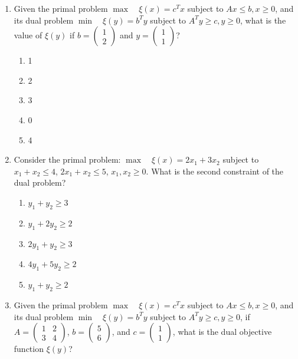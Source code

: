 \documentclass{article}%
\begin{document}
\begin{enumerate}
\begin{enumerate}
\item Weak duality implies that if the primal problem is unbounded, then the dual problem must be infeasible, and vice versa.%
\item Weak duality states that the optimal objective function value of the primal problem is always greater than or equal to the optimal objective function value of the dual problem, regardless of feasibility.%
\item Weak duality is only relevant for linear programs with equality constraints; it does not apply to linear programs with inequality constraints.%
\end{enumerate}%
\vspace{1em}%
\item Given the primal problem $\max \quad \xi(x) = c^T x$ subject to $Ax \le b, x \ge 0$, and its dual problem $\min \quad \xi(y) = b^T y$ subject to $A^T y \ge c, y \ge 0$, what is the value of $\xi(y)$ if $b = \begin{pmatrix} 1 \\ 2 \end{pmatrix}$ and $y = \begin{pmatrix} 1 \\ 1 \end{pmatrix}$?%
\begin{enumerate}%
\item 1%
\item 2%
\item 3%
\item 0%
\item 4%
\end{enumerate}%
\vspace{1em}%
\item Consider the primal problem: $\max \quad \xi(x) = 2x_1 + 3x_2$ subject to $x_1 + x_2 \le 4$, $2x_1 + x_2 \le 5$, $x_1, x_2 \ge 0$. What is the second constraint of the dual problem?%
\begin{enumerate}%
\item $y_1 + y_2 \ge 3$%
\item $y_1 + 2y_2 \ge 2$%
\item $2y_1 + y_2 \ge 3$%
\item $4y_1 + 5y_2 \ge 2$%
\item $y_1 + y_2 \ge 2$%
\end{enumerate}%
\vspace{1em}%
\item Given the primal problem $\max \quad \xi(x) = c^T x$ subject to $Ax \le b, x \ge 0$, and its dual problem $\min \quad \xi(y) = b^T y$ subject to $A^T y \ge c, y \ge 0$, if $A = \begin{pmatrix} 1 & 2 \\ 3 & 4 \end{pmatrix}$, $b = \begin{pmatrix} 5 \\ 6 \end{pmatrix}$, and $c = \begin{pmatrix} 1 \\ 1 \end{pmatrix}$, what is the dual objective function $\xi(y)$?%

\end{enumerate}
\end{document}
